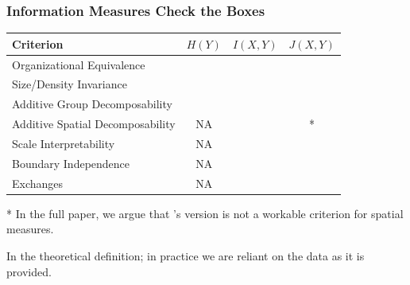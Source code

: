 \documentclass{beamer}
\begin{document}
	\begin{frame}\frametitle{Information Measures Check the Boxes}
		
		\begin{tabular}{l | c | c | c}
			\textbf{Criterion} & $H(Y)$ & $I(X,Y)$ & $J(X,Y)$ \\
			\hline
			Organizational Equivalence & \textcolor{mLightGreen}{\CheckmarkBold} & \textcolor{mLightGreen}{\CheckmarkBold} & \textcolor{mLightGreen}{\CheckmarkBold} \\ 
			Size/Density Invariance & \textcolor{mLightGreen}{\CheckmarkBold} & \textcolor{mLightGreen}{\CheckmarkBold} & \textcolor{mLightGreen}{\CheckmarkBold} \\ 
			Additive Group Decomposability & \textcolor{mLightGreen}{\CheckmarkBold} & \textcolor{mLightGreen}{\CheckmarkBold} & \textcolor{mLightGreen}{\CheckmarkBold} \\ 
			Additive Spatial Decomposability & NA & \textcolor{mLightGreen}{\CheckmarkBold} &  * \\
			Scale Interpretability & NA & \textcolor{mLightGreen}{\CheckmarkBold} & \textcolor{mLightGreen}{\CheckmarkBold}\\ 
			Boundary Independence & NA & \textcolor{mLightBrown}{\CheckmarkBold} & \textcolor{mLightBrown}{\CheckmarkBold} \\ 
			Exchanges & NA & \textcolor{mLightGreen}{\CheckmarkBold} & \textcolor{mLightGreen}{\CheckmarkBold}
		\end{tabular}

		* In the full paper, we argue that \cite{Reardon2004}'s version is not a workable criterion for spatial measures. 

		\textcolor{mLightBrown}{\CheckmarkBold} In the theoretical definition; in practice we are reliant on the data as it is provided. 

	\end{frame}
\end{document}
